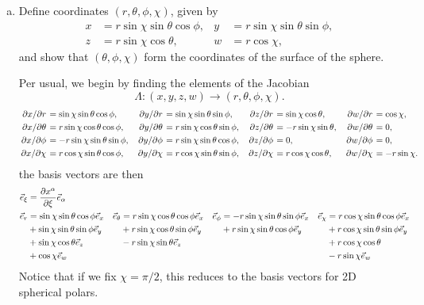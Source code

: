 \documentclass[gr-notes.tex]{subfiles}
\begin{document}
\begin{enumerate}[(a)]
\item Define coordinates $(r,\theta,\phi,\chi)$, given by
%
\begin{align*}
  x &= r \sin\chi \sin\theta \cos\phi, &
  y &= r \sin\chi \sin\theta \sin\phi,
  \\
  z &= r \sin\chi \cos\theta, &
  w &= r \cos\chi,
\end{align*}
%
and show that $(\theta,\phi,\chi)$ form the coordinates of the surface of the sphere.

Per usual, we begin by finding the elements of the Jacobian
%
\begin{displaymath}
  \Lambda : (x,y,z,w) \to (r,\theta,\phi,\chi).
\end{displaymath}
%
\begin{align*}
  \pdv*{x}{r} &=
  \sin\chi \sin\theta \cos\phi, &
  \pdv*{y}{r} &=
  \sin\chi \sin\theta \sin\phi, &
  \pdv*{z}{r} &=
  \sin\chi \cos\theta, &
  \pdv*{w}{r} &=
  \cos\chi,
  \\
  \pdv*{x}{\theta} &=
  r \sin\chi \cos\theta \cos\phi, &
  \pdv*{y}{\theta} &=
  r \sin\chi \cos\theta \sin\phi, &
  \pdv*{z}{\theta} &=
  -r \sin\chi \sin\theta, &
  \pdv*{w}{\theta} &=
  0,
  \\
  \pdv*{x}{\phi} &=
  -r \sin\chi \sin\theta \sin\phi, &
  \pdv*{y}{\phi} &=
  r \sin\chi \sin\theta \cos\phi, &
  \pdv*{z}{\phi} &=
  0, &
  \pdv*{w}{\phi} &=
  0,
  \\
  \pdv*{x}{\chi} &=
  r \cos\chi \sin\theta \cos\phi, &
  \pdv*{y}{\chi} &=
  r \cos\chi \sin\theta \sin\phi, &
  \pdv*{z}{\chi} &=
  r \cos\chi \cos\theta, &
  \pdv*{w}{\chi} &=
  -r \sin\chi.
\end{align*}
%
the basis vectors are then
%
\begin{align*}
  \vec{e}_\xi &=
  \pdv{x^\alpha}{\xi} \vec{e}_\alpha &
  \\
  \vec{e}_r &=
  \sin\chi \sin\theta \cos\phi \vec{e}_x &
%
  \vec{e}_\theta &=
  r \sin\chi \cos\theta \cos\phi \vec{e}_x &
%
  \vec{e}_\phi &=
  -r \sin\chi \sin\theta \sin\phi \vec{e}_x &
  \vec{e}_\chi &=
  r \cos\chi \sin\theta \cos\phi \vec{e}_x
  \\ &+ %
  \sin\chi \sin\theta \sin\phi \vec{e}_y &&+
%
  r \sin\chi \cos\theta \sin\phi \vec{e}_y &&+
%
  r \sin\chi \sin\theta \cos\phi \vec{e}_y &&+
%
  r \cos\chi \sin\theta \sin\phi \vec{e}_y
  \\ &+ %
  \sin\chi \cos\theta \vec{e}_z &&-
%
  r \sin\chi \sin\theta \vec{e}_z &&
%
  &&+
%
  r \cos\chi \cos\theta
  \\ &+
  \cos\chi \vec{e}_w &&
%
  &&
%
  &&-
%
  r \sin\chi \vec{e}_w
\end{align*}
%
Notice that if we fix $\chi = \pi/2$, this reduces to the basis vectors for 2D spherical polars.


\end{enumerate}
\end{document}

